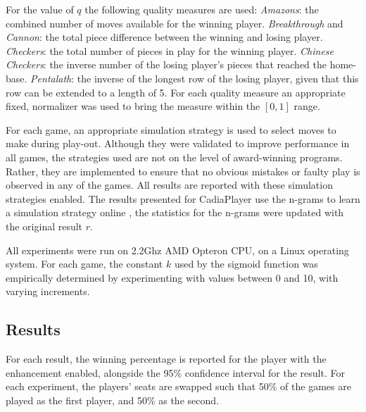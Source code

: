 \documentclass{ecai2014}
\begin{document}
For the value of $q$ the following quality measures are used: \emph{Amazons}: the combined number of moves available for the winning player. \emph{Breakthrough} and \emph{Cannon}: the total piece difference between the winning and losing player. \emph{Checkers}: the total number of pieces in play for the winning player. \emph{Chinese Checkers}: the inverse number of the losing player's pieces that reached the home-base. \emph{Pentalath}: the inverse of the longest row of the losing player, given that this row can be extended to a length of 5.
For each quality measure an appropriate fixed, normalizer was used to bring the measure within the $[0,1]$ range.

For each game, an appropriate simulation strategy is used to select moves to make during play-out. Although they were validated to improve performance in all games, the strategies used are not on the level of award-winning programs. Rather, they are implemented to ensure that no obvious mistakes or faulty play is observed in any of the games. All results are reported with these simulation strategies enabled. The results presented for {\sc CadiaPlayer} use the n-grams to learn a simulation strategy online \cite{takngrams}, the statistics for the n-grams were updated with the original result $r$.

All experiments were run on 2.2Ghz AMD Opteron CPU, on a Linux operating system. For each game, the constant $k$ used by the sigmoid function was empirically determined by experimenting with values between 0 and 10, with varying increments.
\subsection{Results}
\label{subsec:results}
For each result, the winning percentage is reported for the player with the enhancement enabled, alongside the 95\% confidence interval for the result. For each experiment, the players' seats are swapped such that 50\% of the games are played as the first player, and 50\% as the second.
\end{document}
